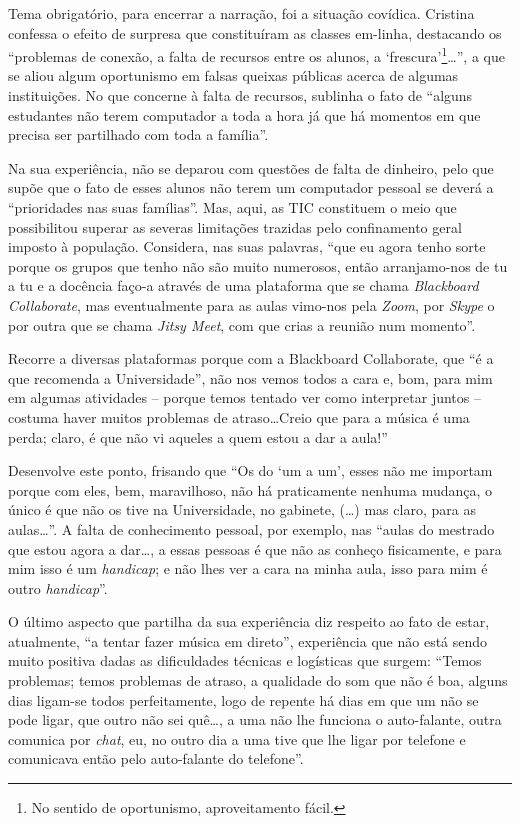 \documentclass{textolivre}
\begin{document}
Tema obrigatório, para encerrar a narração, foi a situação covídica. Cristina
confessa o efeito de surpresa que constituíram as classes em-linha, destacando
os “problemas de conexão, a falta de recursos entre os alunos, a
‘frescura’\footnote{No sentido de oportunismo, aproveitamento fácil.}\ldots”, a
que se aliou algum oportunismo em falsas queixas públicas acerca de algumas
instituições. No que concerne à falta de recursos, sublinha o fato de “alguns
estudantes não terem computador a toda a hora já que há momentos em que precisa
ser partilhado com toda a família”.

Na sua experiência, não se deparou com questões de falta de dinheiro, pelo que
supõe que o fato de esses alunos não terem um computador pessoal se deverá a
“prioridades nas suas famílias”. Mas, aqui, as TIC constituem o meio que
possibilitou superar as severas limitações trazidas pelo confinamento geral
imposto à população. Considera, nas suas palavras, “que eu agora tenho sorte
porque os grupos que tenho não são muito numerosos, então arranjamo-nos de tu a
tu e a docência faço-a através de uma plataforma que se chama
\textit{Blackboard Collaborate}, mas eventualmente para as aulas vimo-nos pela
\textit{Zoom}, por \textit{Skype} o por outra que se chama \textit{Jitsy Meet},
com que crias a reunião num momento”.

Recorre a diversas plataformas porque com a Blackboard Collaborate, que “é a
que recomenda a Universidade”, não nos vemos todos a cara e, bom, para mim em
algumas atividades – porque temos tentado ver como interpretar juntos – costuma
haver muitos problemas de atraso\ldots Creio que para a música é uma perda; claro, é
que não vi aqueles a quem estou a dar a aula!”

Desenvolve este ponto, frisando que “Os do ‘um a um’, esses não me importam
porque com eles, bem, maravilhoso, não há praticamente nenhuma mudança, o único
é que não os tive na Universidade, no gabinete, (\ldots) mas claro, para as
aulas\ldots”. A falta de conhecimento pessoal, por exemplo, nas “aulas do
mestrado que estou agora a dar\ldots, a essas pessoas é que não as conheço
fisicamente, e para mim isso é um \textit{handicap}; e não lhes ver a cara na
minha aula, isso para mim é outro \textit{handicap}”.

O último aspecto que partilha da sua experiência diz respeito ao fato de estar,
atualmente, “a tentar fazer música em direto”, experiência que não está sendo
muito positiva dadas as dificuldades técnicas e logísticas que surgem: “Temos
problemas; temos problemas de atraso, a qualidade do som que não é boa, alguns
dias ligam-se todos perfeitamente, logo de repente há dias em que um não se
pode ligar, que outro não sei quê\ldots, a uma não lhe funciona o auto-falante,
outra comunica por \textit{chat}, eu, no outro dia a uma tive que lhe ligar por
telefone e comunicava então pelo auto-falante do telefone”.
\end{document}
